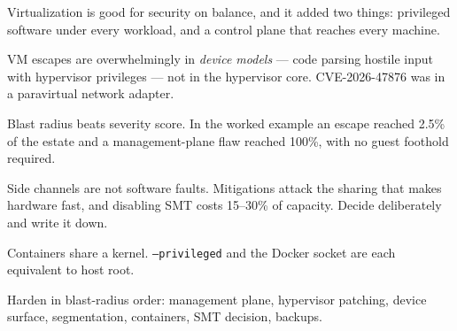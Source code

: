 \begin{chaptersummary}
\begin{tight}
  \item Virtualization is good for security on balance, and it added two
        things: privileged software under every workload, and a control plane
        that reaches every machine.
  \item VM escapes are overwhelmingly in \emph{device models} --- code parsing
        hostile input with hypervisor privileges --- not in the hypervisor
        core. CVE-2026-47876 was in a paravirtual network adapter.
  \item Blast radius beats severity score. In the worked example an escape
        reached 2.5\% of the estate and a management-plane flaw reached 100\%,
        with no guest foothold required.
  \item Side channels are not software faults. Mitigations attack the sharing
        that makes hardware fast, and disabling SMT costs 15--30\% of capacity.
        Decide deliberately and write it down.
  \item Containers share a kernel. \texttt{--privileged} and the Docker socket
        are each equivalent to host root.
  \item Harden in blast-radius order: management plane, hypervisor patching,
        device surface, segmentation, containers, SMT decision, backups.
\end{tight}
\end{chaptersummary}

